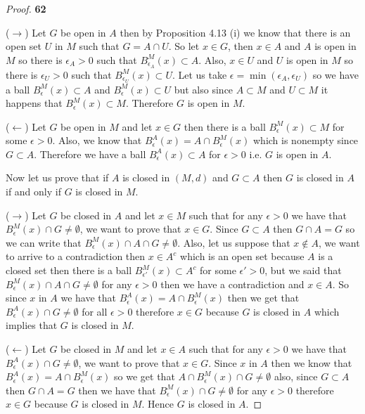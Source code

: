 \documentclass[11pt]{article}
\theoremstyle{definition}
\begin{document}
\cleardoublepage
    \begin{proof}{\textbf{62}}

        ($\rightarrow$) Let $G$ be open in $A$ then by Proposition 4.13 (i) we
        know that there
        is an open set $U$ in $M$ such that $G = A \cap U$. So let $x \in G$,
        then $x \in A$ and $A$ is open in $M$ so there is $\epsilon_A > 0$
        such that $B_{\epsilon_A}^M(x) \subset A$. Also, $x \in U$ and $U$
        is open in $M$ so there is $\epsilon_U > 0$ such that
        $B_{\epsilon_U}^M(x) \subset U$. Let us take
        $\epsilon = \min(\epsilon_A, \epsilon_U)$ so we have a ball
        $B_\epsilon^M(x) \subset A$ and $B_\epsilon^M(x) \subset U$ but also
        since $A \subset M$ and $U \subset M$ it happens that
        $B_\epsilon^M(x) \subset M$. Therefore $G$ is open in $M$.

        ($\leftarrow$) Let $G$ be open in $M$ and let $x \in G$ then there is a
        ball $B_{\epsilon}^M(x) \subset M$ for some $\epsilon > 0$. Also, we
        know that $B_{\epsilon}^A(x) = A \cap B_{\epsilon}^M(x)$ which is
        nonempty since $G \subset A$. Therefore we have a ball
        $B_{\epsilon}^A(x) \subset A$ for $\epsilon > 0$ i.e. $G$ is open in
        $A$.

        Now let us prove that if $A$ is closed in $(M,d)$ and $G \subset A$
        then $G$ is closed in $A$ if and only if $G$ is closed in $M$.

        ($\rightarrow$) Let $G$ be closed in $A$ and let $x \in M$
        such that for any $\epsilon > 0$ we have that
        $B_{\epsilon}^M(x) \cap G \neq \emptyset$, we want to prove that
        $x \in G$. Since $G \subset A$ then $G \cap A = G$ so we can write that
        $B_{\epsilon}^M(x) \cap A \cap G \neq \emptyset$. Also, let us suppose
        that $x \not\in A$, we want to arrive to a contradiction then $x \in A^c$
        which is an open set because $A$ is a closed set then there is a ball
        $B_{\epsilon'}^M(x) \subset A^c$ for some $\epsilon' > 0$, but we said
        that $B_{\epsilon}^M(x) \cap A \cap G \neq \emptyset$ for any $\epsilon > 0$
        then we have a contradiction and $x \in A$. So since $x$ in $A$ we have
        that $B_{\epsilon}^A(x) = A \cap B_\epsilon^M(x)$ then we get that
        $B_{\epsilon}^A(x) \cap G \neq \emptyset$ for all $\epsilon > 0$
        therefore $x \in G$ because $G$ is closed in $A$ which implies that $G$
        is closed in $M$.
        
        ($\leftarrow$) Let $G$ be closed in $M$ and let $x \in A$
        such that for any $\epsilon > 0$ we have that
        $B_{\epsilon}^A(x) \cap G \neq \emptyset$, we want to prove that
        $x \in G$. Since $x$ in $A$ then we know that
        $B_{\epsilon}^A(x) = A \cap B_\epsilon^M(x)$ so we get that
        $A \cap B_{\epsilon}^M(x) \cap G \neq \emptyset$ also, since
        $G \subset A$ then $G \cap A = G$ then we have that
        $B_{\epsilon}^M(x) \cap G \neq \emptyset$ for any $\epsilon > 0$
        therefore $x \in G$ because $G$ is closed in $M$. Hence $G$ is closed 
        in $A$. 

    \end{proof}
\end{document}
